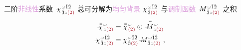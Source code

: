 二阶\textcolor{Plum}{非线性}系数 $\Xint{{}^{}_{\mathcolor{gray}{-}}}{23}{\chi}^{\;\! \mathcolor{gray}{\omega} \hat{1} \hat{2} }_{\;\! \hat{3} \mathcolor{gray}{z} \textcolor{Maroon}{(2)} }$ 总可分解为\textcolor{Plum}{均匀背景} ${\chi}^{\;\! \mathcolor{gray}{\omega} \hat{1} \hat{2} }_{\;\! \hat{3} \textcolor{Maroon}{(2)} }$ 与\textcolor{Plum}{调制函数} $\Xint{\mathcolor{gray}{-}}{18}{M}^{\;\! \mathcolor{gray}{\omega} \hat{1} \hat{2} }_{\;\! \hat{3} \mathcolor{gray}{z} \textcolor{Maroon}{(2)} }$ 之积
\begin{subequations} \label{eq:chi2-modulate}
\begin{align}
	\Xint{{}^{}_{\mathcolor{gray}{-}}}{23}{\bar{\bar{\bar{\chi}}}}^{\;\! \mathcolor{gray}{\omega} }_{\;\! \mathcolor{gray}{z} \textcolor{Maroon}{(2)} } &= \bar{\bar{\bar{\chi}}}^{\;\! \mathcolor{gray}{\omega} }_{\;\! \textcolor{Maroon}{(2)} } \odot \Xint{\mathcolor{gray}{-}}{18}{\bar{\bar{\bar{M}}}}^{\;\! \mathcolor{gray}{\omega} }_{\;\! \mathcolor{gray}{z} \textcolor{Maroon}{(2)} } \label{eq:vec-eq:chi2-modulate} \\
	\Xint{{}^{}_{\mathcolor{gray}{-}}}{23}{\chi}^{\;\! \mathcolor{gray}{\omega} \hat{1} \hat{2} }_{\;\! \hat{3} \mathcolor{gray}{z} \textcolor{Maroon}{(2)} } &= {\chi}^{\;\! \mathcolor{gray}{\omega} \hat{1} \hat{2} }_{\;\! \hat{3} \textcolor{Maroon}{(2)} } \Xint{\mathcolor{gray}{-}}{18}{M}^{\;\! \mathcolor{gray}{\omega} \hat{1} \hat{2} }_{\;\! \hat{3} \mathcolor{gray}{z} \textcolor{Maroon}{(2)} } ~, \label{eq:components-eq:chi2-modulate}
\end{align}
\end{subequations}
